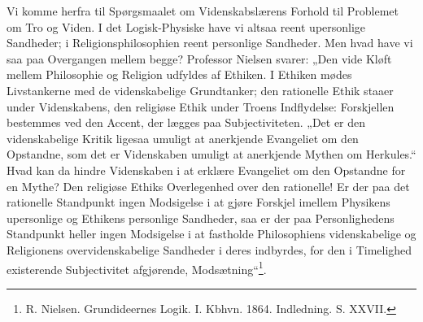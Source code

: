 \documentclass[12pt,a4paper]{book}
\begin{document}
Vi komme herfra til Spørgsmaalet om Videnskabslærens
Forhold til Problemet om Tro og Viden.
I det Logisk-Physiske have vi altsaa reent upersonlige
Sandheder; i Religionsphilosophien reent personlige Sandheder.
Men hvad have vi saa paa Overgangen mellem
begge? Professor Nielsen svarer: „Den vide Kløft
mellem Philosophie og Religion udfyldes af Ethiken. I
Ethiken mødes Livstankerne med de videnskabelige Grundtanker;
den rationelle Ethik staaer under Videnskabens,
den religiøse Ethik under Troens Indflydelse: Forskjellen
bestemmes ved den Accent, der lægges paa Subjectiviteten.
„Det er den videnskabelige Kritik ligesaa umuligt
at anerkjende Evangeliet om den Opstandne, som det er
Videnskaben umuligt at anerkjende Mythen om Herkules.“
Hvad kan da hindre Videnskaben i at erklære Evangeliet
om den Opstandne for en Mythe? Den religiøse Ethiks
Overlegenhed over den rationelle! Er der paa det rationelle
Standpunkt ingen Modsigelse i at gjøre Forskjel
imellem Physikens upersonlige og Ethikens personlige
Sandheder, saa er der paa Personlighedens Standpunkt
heller ingen Modsigelse i at fastholde Philosophiens
videnskabelige og Religionens overvidenskabelige Sandheder
i deres indbyrdes, for den i Timelighed existerende
Subjectivitet afgjørende, Modsætning“\footnote{R. Nielsen. Grundideernes Logik. I. Kbhvn. 1864. Indledning. S. XXVII.}.
\end{document}
